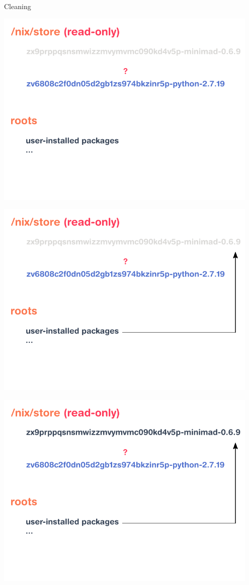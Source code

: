 \documentclass[t, aspectratio=169]{beamer}
\begin{document}
\begin{frame}{Cleaning}
     {
        \begin{center}
            \includegraphics[width=0.95\textwidth]{img/schema-nix-store-cleaning-roots.pdf}
        \end{center}
    }
     {
        \begin{center}
            \includegraphics[width=0.95\textwidth]{img/schema-nix-store-gc-1.pdf}
        \end{center}
    }
     {
        \begin{center}
            \includegraphics[width=0.95\textwidth]{img/schema-nix-store-gc-2.pdf}

\end{center}}
\end{frame}
\end{document}
